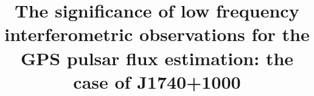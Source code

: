 \documentclass[manuscript]{aastex63}
\begin{document}
\title{The significance of low frequency interferometric observations for the GPS pulsar flux estimation: the case of J1740+1000}


\end{document}
